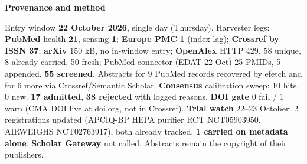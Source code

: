 \documentclass[10pt]{article}
\begin{document}
\vspace{2mm}

\begin{keybox}
{\sffamily\bfseries\footnotesize\color{Deep}Provenance and method}\\[1.2mm]
{\fontsize{7.2}{8.8}\selectfont
Entry window \textbf{22 October 2026}, single day (Thursday). Harvester legs: \textbf{PubMed} health
\textbf{21}, sensing \textbf{1}; \textbf{Europe PMC} \textbf{1} (index lag); \textbf{Crossref by ISSN} \textbf{37};
\textbf{arXiv} 150 kB, no in-window entry; \textbf{OpenAlex} HTTP 429. 58 unique, 8 already carried, 50 fresh;
PubMed connector (EDAT 22 Oct) 25 PMIDs, 5 appended, \textbf{55 screened}. Abstracts for 9 PubMed records recovered
by efetch and for 6 more via Crossref/Semantic Scholar. \textbf{Consensus} calibration sweep: 10 hits, 0 new.
\textbf{17 admitted}, \textbf{38 rejected} with logged reasons. \textbf{DOI gate} 0 fail / 1 warn (CMA DOI live at
doi.org, not in Crossref). \textbf{Trial watch} 22--23 October: 2 registrations updated (APCIQ-BP HEPA purifier RCT
NCT05903950, AIRWEIGHS NCT02763917), both already tracked. \textbf{1 carried on metadata alone}. \textbf{Scholar
Gateway} not called. Abstracts remain the copyright of their publishers.\par}
\end{keybox}
\end{document}
